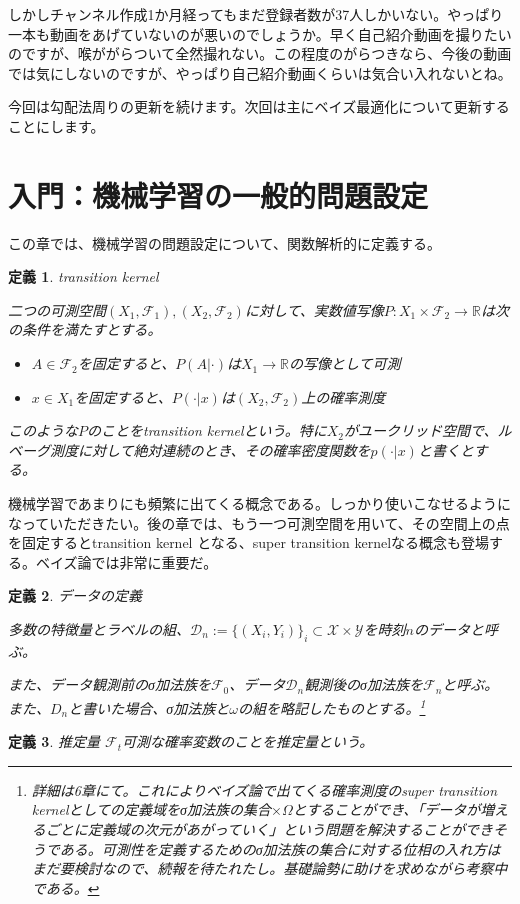 \documentclass{jsarticle}
\newtheorem{defi}{定義}[section]
\begin{document}
しかしチャンネル作成1か月経ってもまだ登録者数が37人しかいない。やっぱり一本も動画をあげていないのが悪いのでしょうか。早く自己紹介動画を撮りたいのですが、喉ががらついて全然撮れない。この程度のがらつきなら、今後の動画では気にしないのですが、やっぱり自己紹介動画くらいは気合い入れないとね。


今回は勾配法周りの更新を続けます。次回は主にベイズ最適化について更新することにします。




\newpage





\section{入門：機械学習の一般的問題設定}

この章では、機械学習の問題設定について、関数解析的に定義する。

\begin{defi} transition kernel

二つの可測空間$(X_1,\mathcal{F}_1),(X_2,\mathcal{F}_2)$に対して、実数値写像$P:X_1\times \mathcal{F_2}\to \mathbb{R}$は次の条件を満たすとする。

\begin{itemize}
\item $A\in \mathcal{F_2}$を固定すると、$P(A|\cdot)$は$X_1\to\mathbb{R}$の写像として可測
\item $x\in X_1$を固定すると、$P(\cdot|x)$は$(X_2,\mathcal{F}_2)$上の確率測度
\end{itemize}

このような$P$のことをtransition kernelという。特に$X_2$がユークリッド空間で、ルベーグ測度に対して絶対連続のとき、その確率密度関数を$p(\cdot|x)$と書くとする。

\end{defi}

機械学習であまりにも頻繁に出てくる概念である。しっかり使いこなせるようになっていただきたい。後の章では、もう一つ可測空間を用いて、その空間上の点を固定するとtransition kernel となる、super transition kernelなる概念も登場する。ベイズ論では非常に重要だ。

\begin{defi} データの定義

多数の特徴量とラベルの組、$\mathcal{D}_n:=\{(X_i,Y_i)\}_i\subset \mathcal{X}\times \mathcal{Y}$を時刻$n$のデータと呼ぶ。

また、データ観測前のσ加法族を$\mathcal{F}_0$、データ$\mathcal{D}_n$観測後のσ加法族を$\mathcal{F}_n$と呼ぶ。また、$D_n$と書いた場合、σ加法族と$\omega$の組を略記したものとする。\footnote{詳細は6章にて。これによりベイズ論で出てくる確率測度のsuper transition kernelとしての定義域をσ加法族の集合$\times\Omega$とすることができ、「データが増えるごとに定義域の次元があがっていく」という問題を解決することができそうである。可測性を定義するためのσ加法族の集合に対する位相の入れ方はまだ要検討なので、続報を待たれたし。基礎論勢に助けを求めながら考察中である。}


\end{defi}
\begin{defi} 推定量
$\mathcal{F}_t$可測な確率変数のことを推定量という。
\end{defi}
\end{document}
